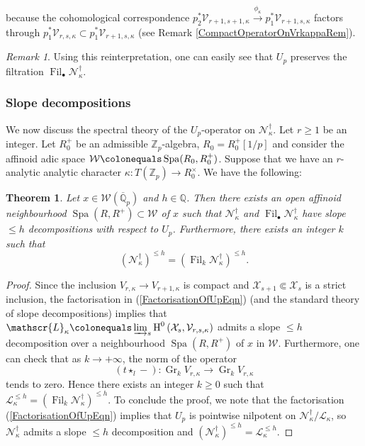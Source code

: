 \documentclass[10pt, oneside]{amsart}
\newcommand{\defeq}{\colonequals}
\numberwithin{equation}{subsection}
\newtheorem{theorem}[equation]{Theorem}
\theoremstyle{definition}
\theoremstyle{remark}
\newtheorem{remark}[equation]{Remark}
\newcommand{\mbb}[1]{\mathbb{#1}}
\newcommand{\opn}[1]{\operatorname{#1}}
\begin{document}
because the cohomological correspondence $p_2^*\mathcal{V}_{r+1, s+1, \kappa} \xrightarrow{\phi_{\kappa}} p_1^*\mathcal{V}_{r+1, s, \kappa}$ factors through $p_1^* \mathcal{V}_{r, s, \kappa} \subset p_1^*\mathcal{V}_{r+1, s, \kappa}$ (see Remark \ref{CompactOperatorOnVrkappaRem}).

\begin{remark}
    Using this reinterpretation, one can easily see that $U_p$ preserves the filtration $\opn{Fil}_{\bullet}\mathscr{N}^{\dagger}_{\kappa}$.
\end{remark}

\subsubsection{Slope decompositions}

We now discuss the spectral theory of the $U_p$-operator on $\mathscr{N}^{\dagger}_{\kappa}$. Let $r \geq 1$ be an integer. Let $R_0^+$ be an admissible $\mbb{Z}_p$-algebra, $R_0 = R_0^+[1/p]$ and consider the affinoid adic space $\mathcal{W} \defeq \opn{Spa}(R_0, R_0^+)$. Suppose that we have an $r$-analytic analytic character $\kappa \colon T(\mbb{Z}_p) \to R_0^{\times}$. We have the following:

\begin{theorem} \label{SlopeDecompositionForNdaggerThm}
Let $x \in \mathcal{W}(\overline{\mbb{Q}}_p)$ and $h \in \mbb{Q}$. Then there exists an open affinoid neighbourhood $\opn{Spa}(R, R^+) \subset \mathcal{W}$ of $x$ such that $\mathscr{N}^{\dagger}_{\kappa}$ and $\opn{Fil}_{\bullet}\mathscr{N}_{\kappa}^{\dagger}$ have slope $\leq h$ decompositions with respect to $U_p$. Furthermore, there exists an integer $k$ such that
\[
(\mathscr{N}^{\dagger}_{\kappa})^{\leq h} = (\opn{Fil}_{k}\mathscr{N}^{\dagger}_{\kappa})^{\leq h} .
\]
\end{theorem}
\begin{proof}
    Since the inclusion $V_{r, \kappa} \to V_{r+1, \kappa}$ is compact and $\mathcal{X}_{s+1} \Subset \mathcal{X}_s$ is a strict inclusion, the factorisation in (\ref{FactorisationOfUpEqn}) (and the standard theory of slope decompositions) implies that $\mathscr{L}_{\kappa} \defeq \varinjlim_s\opn{H}^0\left(\mathcal{X}_s, \mathcal{V}_{r, s, \kappa} \right)$ admits a slope $\leq h$ decomposition over a neighbourhood $\opn{Spa}(R, R^+)$ of $x$ in $\mathcal{W}$. Furthermore, one can check that as $k \to +\infty$, the norm of the operator
    \[
    (t \star_l - ) \colon \opn{Gr}_k V_{r, \kappa} \to \opn{Gr}_k V_{r, \kappa}
    \]
    tends to zero. Hence there exists an integer $k \geq 0$ such that $\mathscr{L}_{\kappa}^{\leq h} = (\opn{Fil}_{k}\mathscr{N}^{\dagger}_{\kappa})^{\leq h}$. To conclude the proof, we note that the factorisation (\ref{FactorisationOfUpEqn}) implies that $U_p$ is pointwise nilpotent on $\mathscr{N}^{\dagger}_{\kappa}/\mathscr{L}_{\kappa}$, so $\mathscr{N}^{\dagger}_{\kappa}$ admits a slope $\leq h$ decomposition and $(\mathscr{N}^{\dagger}_{\kappa})^{\leq h} = \mathscr{L}_{\kappa}^{\leq h}$.
\end{proof}
\end{document}
